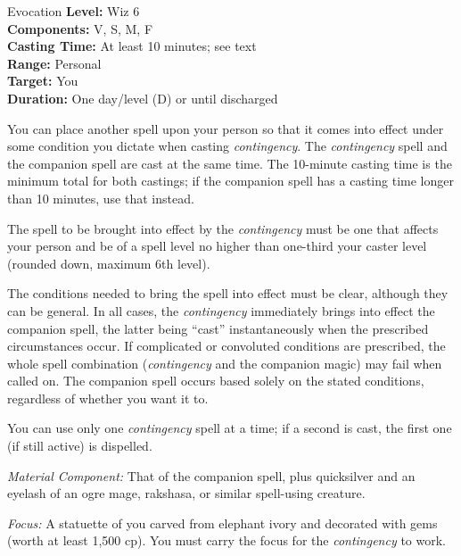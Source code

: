 {Evocation}
{
	\textbf{Level:}
	Wiz 6\\
	\textbf{Components:}
	V, S, M, F\\
	\textbf{Casting Time:}
	At least 10 minutes; see text\\
	\textbf{Range:}
	Personal\\
	\textbf{Target:}
	You\\
	\textbf{Duration:}
	One day/level (D) or until discharged\\
}
{
	You can place another spell upon your person so that it comes into effect under some condition you dictate when casting \emph{contingency}. The \emph{contingency} spell and the companion spell are cast at the same time. The 10-minute casting time is the minimum total for both castings; if the companion spell has a casting time longer than 10 minutes, use that instead.

	The spell to be brought into effect by the \emph{contingency} must be one that affects your person and be of a spell level no higher than one-third your caster level (rounded down, maximum 6th level).

	The conditions needed to bring the spell into effect must be clear, although they can be general. In all cases, the \emph{contingency} immediately brings into effect the companion spell, the latter being ``cast'' instantaneously when the prescribed circumstances occur. If complicated or convoluted conditions are prescribed, the whole spell combination (\emph{contingency} and the companion magic) may fail when called on. The companion spell occurs based solely on the stated conditions, regardless of whether you want it to.

	You can use only one \emph{contingency} spell at a time; if a second is cast, the first one (if still active) is dispelled.

	\textit{Material Component:}
	That of the companion spell, plus quicksilver and an eyelash of an ogre mage, rakshasa, or similar spell-using creature.

	\textit{Focus:}
	A statuette of you carved from elephant ivory and decorated with gems (worth at least 1,500 cp). You must carry the focus for the \emph{contingency} to work.

}
